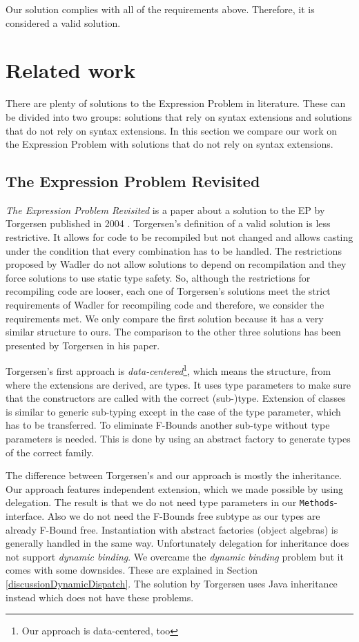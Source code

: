 \documentclass{report}
\begin{document}
Our solution complies with all of the requirements above. Therefore, it is considered a valid solution.

\section{Related work}

There are plenty of solutions to the Expression Problem in literature. These can be divided into two groups: solutions that rely on syntax extensions and solutions that do not rely on syntax extensions. In this section we compare our work on the Expression Problem with solutions that do not rely on syntax extensions.

\subsection*{The Expression Problem Revisited}

\emph{The Expression Problem Revisited} is a paper about a solution to the EP by Torgersen published in 2004 \cite{Torgersen-Expression-2004}.
Torgersen's definition of a valid solution is less restrictive. It allows for code to be recompiled but not changed and allows casting under the condition that every combination has to be handled. The restrictions proposed by Wadler \cite{Wadler-Expression-1998} do not allow solutions to depend on recompilation and they force solutions to use static type safety. So, although the restrictions for recompiling code are looser, each one of Torgersen's solutions meet the strict requirements of Wadler for recompiling code and therefore, we consider the requirements met. We only compare the first solution because it has a very similar structure to ours. The comparison to the other three solutions has been presented by Torgersen in his paper.

Torgersen's first approach is \emph{data-centered}\footnote{Our approach is data-centered, too}, which means the structure, from where the extensions are derived, are types. It uses type parameters to make sure that the constructors are called with the correct (sub-)type. Extension of classes is similar to generic sub-typing except in the case of the type parameter, which has to be transferred. To eliminate F-Bounds another sub-type without type parameters is needed. This is done by using an abstract factory to generate types of the correct family.

The difference between Torgersen's and our approach is mostly the inheritance. Our approach features independent extension, which we made possible by using delegation. The result is that we do not need type parameters in our \lstinline{Methods}-interface. Also we do not need the F-Bounds free subtype as our types are already F-Bound free. Instantiation with abstract factories (object algebras) is generally handled in the same way.
Unfortunately delegation for inheritance does not support \emph{dynamic binding}. We overcame the \emph{dynamic binding} problem but it comes with some downsides. These are explained in Section \ref{discussionDynamicDispatch}. The solution by Torgersen uses Java inheritance instead which does not have these problems.
\end{document}
